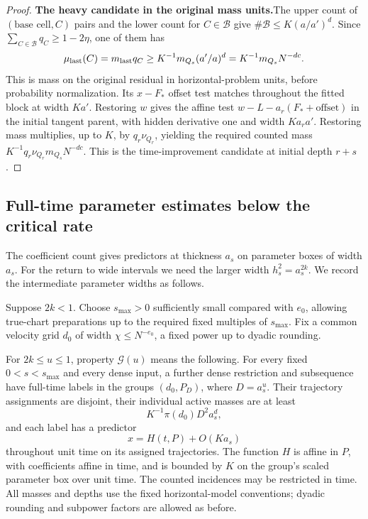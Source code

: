 \begin{proof}
\par\smallskip\noindent\textbf{The heavy candidate in the original mass units.}\quad  The upper count of \((\text{base cell},C)\) pairs and the lower count
for \(C\in\mathcal B\) give \(\#\mathcal B\le K(a/a')^d\).
Since \(\sum_{C\in\mathcal B}q_C\ge1-2\eta\), one of them has
\[
 \mu_{\rm last}(C)=m_{\rm last}q_C
 \ge K^{-1}m_{Q_s}(a'/a)^d
 =K^{-1}m_{Q_s}N^{-dc}.
\]
This is mass on the original residual in horizontal-problem units,
before probability normalization. Its \(x-F_*\) offset test matches throughout the fitted
block at width \(K a'\). Restoring \(w\) gives the affine test
\(w-L-a_r(F_*+\text{offset})\) in the initial tangent parent,
with hidden derivative one and width \(K a_r a'\).
Restoring mass multiplies, up to \(K\), by \(q_r\nu_{Q_r}\),
yielding the required counted mass
\(K^{-1}q_r\nu_{Q_r}m_{Q_s}N^{-dc}\).
This is the time-improvement candidate at initial depth \(r+s\).

\end{proof}

\subsection{Full-time parameter estimates below the critical rate}

The coefficient count gives predictors at thickness \(a_s\) on
parameter boxes of width \(a_s\). For the return to wide intervals
we need the larger width \(h_s^2=a_s^{2k}\). We record the
intermediate parameter widths as follows.

\begin{definition}
\label{a07:bootstrap-property}
Suppose \(2k<1\). Choose \(s_{\max}>0\) sufficiently small
compared with \(e_0\), allowing true-chart preparations up to the
required fixed multiples of \(s_{\max}\). Fix a common velocity
grid \(d_0\) of width \(\chi\le N^{-e_0}\), a fixed power
up to dyadic rounding.

For \(2k\le u\le1\), property \(\mathcal G(u)\) means the
following. For every fixed \(0<s<s_{\max}\) and every dense
input, a further dense restriction and subsequence have full-time
labels in the groups \((d_0,P_D)\), where \(D=a_s^u\).
Their trajectory assignments are disjoint, their individual active
masses are at least
\[
 K^{-1}\pi(d_0)D^2a_s^d,
\]
and each label has a predictor
\[
 x=H(t,P)+O(Ka_s)
\]
throughout unit time on its assigned trajectories. The function
\(H\) is affine in \(P\), with coefficients affine in time,
and is bounded by \(K\) on the group's scaled parameter box
over unit time. The counted incidences may be restricted in time.
All masses and depths use the fixed horizontal-model conventions;
dyadic rounding and subpower factors are allowed as before.
\end{definition}

